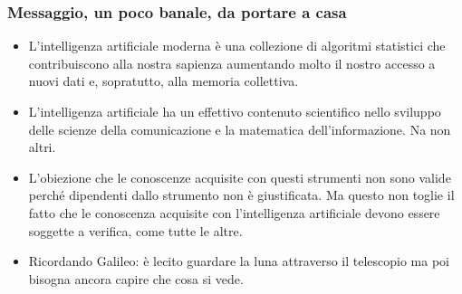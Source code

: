 \documentclass[xcolor=svgnames]{beamer}
\begin{document}
\begin{frame}[plain]\frametitle{Messaggio, un poco banale, da portare a casa}

\begin{itemize}
\item L'intelligenza artificiale moderna è una collezione di algoritmi statistici che contribuiscono alla nostra sapienza aumentando molto il nostro accesso a nuovi dati e, sopratutto, alla memoria collettiva.
\item
L'intelligenza artificiale ha un effettivo contenuto scientifico nello sviluppo delle scienze della comunicazione e la matematica dell'informazione. Na non altri.
\item
L'obiezione che le conoscenze acquisite con questi strumenti non sono valide perché dipendenti dallo strumento non è giustificata. Ma questo non toglie il fatto che le conoscenza acquisite con l'intelligenza artificiale devono essere soggette a verifica, come tutte le altre.
\item
Ricordando Galileo: è lecito guardare la luna attraverso il telescopio ma poi bisogna ancora capire che cosa si vede.
 \end{itemize}  
\end{frame}
\end{document}

